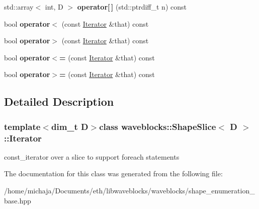 \begin{DoxyCompactItemize}
\item 
\hypertarget{classwaveblocks_1_1_shape_slice_1_1_iterator_a7d935bb6d747291867558e2343fb4704}{}std\+::array$<$ int, D $>$ {\bfseries operator\mbox{[}$\,$\mbox{]}} (std\+::ptrdiff\+\_\+t n) const \label{classwaveblocks_1_1_shape_slice_1_1_iterator_a7d935bb6d747291867558e2343fb4704}

\item 
\hypertarget{classwaveblocks_1_1_shape_slice_1_1_iterator_a4ddaac7ccc8802d464af1b9611d0ce40}{}bool {\bfseries operator$<$} (const \hyperlink{classwaveblocks_1_1_shape_slice_1_1_iterator}{Iterator} \&that) const \label{classwaveblocks_1_1_shape_slice_1_1_iterator_a4ddaac7ccc8802d464af1b9611d0ce40}

\item 
\hypertarget{classwaveblocks_1_1_shape_slice_1_1_iterator_ad03f71348fb7c1f67c531076d4d129a0}{}bool {\bfseries operator$>$} (const \hyperlink{classwaveblocks_1_1_shape_slice_1_1_iterator}{Iterator} \&that) const \label{classwaveblocks_1_1_shape_slice_1_1_iterator_ad03f71348fb7c1f67c531076d4d129a0}

\item 
\hypertarget{classwaveblocks_1_1_shape_slice_1_1_iterator_a0b789953983c612866b38c49cf7c8b27}{}bool {\bfseries operator$<$=} (const \hyperlink{classwaveblocks_1_1_shape_slice_1_1_iterator}{Iterator} \&that) const \label{classwaveblocks_1_1_shape_slice_1_1_iterator_a0b789953983c612866b38c49cf7c8b27}

\item 
\hypertarget{classwaveblocks_1_1_shape_slice_1_1_iterator_a7b7925a9710cc5cb39ae7f1efa62dcf5}{}bool {\bfseries operator$>$=} (const \hyperlink{classwaveblocks_1_1_shape_slice_1_1_iterator}{Iterator} \&that) const \label{classwaveblocks_1_1_shape_slice_1_1_iterator_a7b7925a9710cc5cb39ae7f1efa62dcf5}

\end{DoxyCompactItemize}


\subsection{Detailed Description}
\subsubsection*{template$<$dim\+\_\+t D$>$class waveblocks\+::\+Shape\+Slice$<$ D $>$\+::\+Iterator}

const\+\_\+iterator over a slice to support foreach statements 

The documentation for this class was generated from the following file\+:\begin{DoxyCompactItemize}
\item 
/home/michaja/\+Documents/eth/libwaveblocks/waveblocks/shape\+\_\+enumeration\+\_\+base.\+hpp\end{DoxyCompactItemize}
